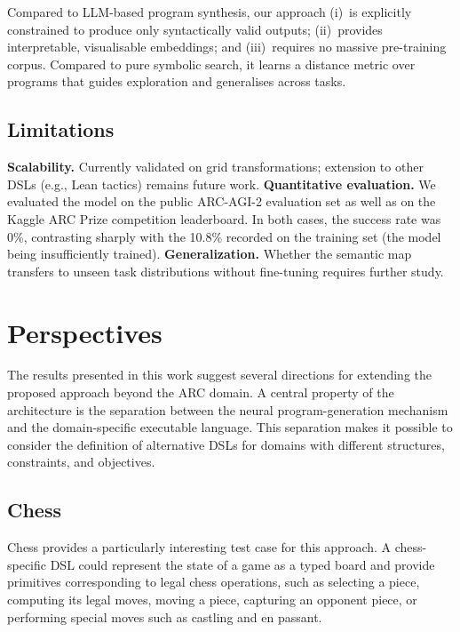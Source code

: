 \documentclass[final]{nesy2027}
\begin{document}
Compared to LLM-based program synthesis, our approach (i)~is explicitly
constrained to produce only syntactically valid outputs; (ii)~provides
interpretable, visualisable embeddings; and (iii)~requires no massive
pre-training corpus.
Compared to pure symbolic search, it learns a distance metric over programs that
guides exploration and generalises across tasks.

\subsection{Limitations}

\textbf{Scalability.} Currently validated on grid transformations; extension to
other DSLs (e.g., Lean tactics) remains future work.
\textbf{Quantitative evaluation.} We evaluated the model on the public ARC-AGI-2 evaluation 
set as well as on the Kaggle ARC Prize competition leaderboard. In both cases, the success 
rate was 0\%, contrasting sharply with the 10.8\% recorded on the training set (the model being 
insufficiently trained).
\textbf{Generalization.} Whether the semantic map transfers to unseen task
distributions without fine-tuning requires further study.

\section{Perspectives}
\label{sec:perspectives}

The results presented in this work suggest several directions for extending
the proposed approach beyond the ARC domain. A central property of the
architecture is the separation between the neural program-generation
mechanism and the domain-specific executable language. This separation makes
it possible to consider the definition of alternative DSLs for domains with
different structures, constraints, and objectives.

\subsection{Chess}
\label{subsec:perspectives-chess}

Chess provides a particularly interesting test case for this approach. A
chess-specific DSL could represent the state of a game as a typed board and
provide primitives corresponding to legal chess operations, such as selecting
a piece, computing its legal moves, moving a piece, capturing an opponent
piece, or performing special moves such as castling and en passant.
\end{document}
